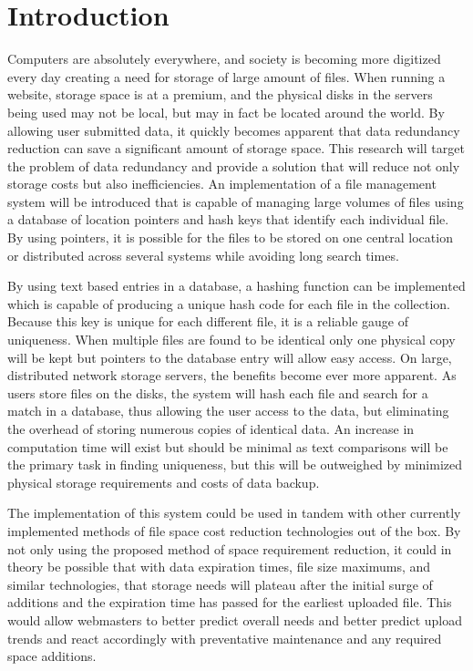 \documentclass[11pt]{article}
\begin{document}
\maketitle

\vspace*{-.4in}
\section{Introduction}
\label{sec:introduction}
\vspace*{-.1in}

Computers are absolutely everywhere, and society is becoming more digitized every day creating a need for storage of large amount of files. When running a website, storage space is at a premium, and the physical disks in the servers being used may not be local, but may in fact be located around the world. By allowing user submitted data, it quickly becomes apparent that data redundancy reduction can save a significant amount of storage space. This research will target the problem of data redundancy and provide a solution that will reduce not only storage costs but also inefficiencies. An implementation of a file management system will be introduced that is capable of managing large volumes of files using a database of location pointers and hash keys that identify each individual file. By using pointers, it is possible for the files to be stored on one central location or distributed across several systems while avoiding long search times.

By using text based entries in a database, a hashing function can be implemented which is capable of producing a unique hash code for each file in the collection. Because this key is unique for each different file, it is a reliable gauge of uniqueness. When multiple files are found to be identical only one physical copy will be kept but pointers to the database entry will allow easy access. On large, distributed network storage servers, the benefits become ever more apparent. As users store files on the disks, the system will hash each file and search for a match in a database, thus allowing the user access to the data, but eliminating the overhead of storing numerous copies of identical data. An increase in computation time will exist but should be minimal as text comparisons will be the primary task in finding uniqueness, but this will be outweighed by minimized physical storage requirements and costs of data backup.

The implementation of this system could be used in tandem with other currently implemented methods of file space cost reduction technologies out of the box. By not only using the proposed method of space requirement reduction, it could in theory be possible that with data expiration times, file size maximums, and similar technologies, that storage needs will plateau after the initial surge of additions and the expiration time has passed for the earliest uploaded file. This would allow webmasters to better predict overall needs and better predict upload trends and react accordingly with preventative maintenance and any required space additions.
\end{document}
